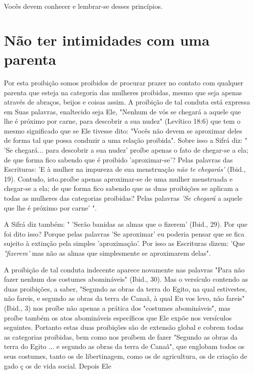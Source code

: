 \begin{itemize}
\begin{enumrate}
\begin{itemize}
\begin{itemize}
\begin{itemize}
Vocês devem conhecer e lembrar-se desses princípios.


\section{Não ter intimidades com uma parenta}

Por esta proibição somos proibidos de procurar prazer no contato com
qualquer parenta que esteja na categoria das mulheres proibidas, mesmo
que seja apenas através de abraços, beijos e coisas assim. A proibição
de tal con­duta está expressa em Suas palavras, enaltecido seja Ele,
"Nenhum de vós se chegará a aquele que lhe é próximo por carne, para
descobrir a sua nudez" (Le­vítico 18:6) que tem o mesmo significado que
se Ele tivesse dito: "Vocês não devem se aproximar deles de forma tal
que possa conduzir a uma relação proi­bida". Sobre isso a Sifrá diz: "
'Se chegará... para descobrir a sua nudez' proíbe apenas o fato de
chegar-se a ela; de que forma fico sabendo que é proibido
'aproximar-se'? Pelas palavras das Escrituras: 'E à mulher na impureza
de sua menstruação \emph{não te chegarás'} (Ibid., 19). Contudo,
isto.proíbe apenas aproximar-se de uma mulher menstruada e chegar-se a
ela; de que forma fico sabendo que as duas proibições se aplicam a todas
as mulheres das categorias proibidas? Pe­las palavras \emph{'Se chegará}
a aquele que lhe é próximo por carne' ".

A Sifrá diz também: " 'Serão banidas as almas que o fizerem' (Ibid.,
29). Por que foi dito isso? Porque pelas palavras 'Se aproximar' eu
poderia pen­sar que se fica sujeito à extinção pela simples
'aproximação'. Por isso as Escri­turas dizem: 'Que \emph{°fizerem'} mas
não as almas que simplesmente se aproxima­rem delas".

A proibição de tal conduta indecente aparece novamente nas pala­vras
"Para não fazer nenhum dos costumes abomináveis" (Ibid., 30). Mas o
ver­sículo contendo as duas proibições, a saber, "Segundo as obras da
terra do Egi­to, na qual estivestes, não fareis, e segundo as obras da
terra de Canaã, à qual Eu vos levo, não fareis" (Ibid., 3) nos proíbe
não apenas a prática dos "costu­mes abomináveis", mas proíbe também os
atos abomináveis específicos que Ele expõe nos versículos seguintes.
Portanto estas duas proibições são de ex­tensão global e cobrem todas as
categorias proibidas, bem como nos proíbem de fazer "Segundo as obras da
terra do Egito ... e segundo as obras da terra de Canaã", que englobam
todos os seus costumes, tanto os de libertinagem, como os de
agricultura, os de criação de gado ç os de vida social. Depois Ele



\end{itemize}
\end{itemize}
\end{itemize}
\end{enumrate}
\end{itemize}
